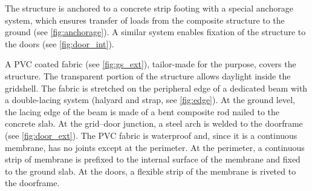 The structure is anchored to a concrete strip footing with a special anchorage system, which ensures transfer of loads from the composite structure to the ground (see \cref{fig:anchorage}). A similar system enables fixation of the structure to the doors (see \cref{fig:door_int}).

A PVC coated fabric (see \cref{fig:gs_ext}), tailor-made for the purpose, covers the structure. The transparent portion of the structure allows daylight inside the gridshell. The fabric is stretched on the peripheral edge of a dedicated beam with a double-lacing system (halyard and strap, see \cref{fig:edge}). At the ground level, the lacing edge of the beam is made of a bent composite rod nailed to the concrete slab. At the grid–door junction, a steel arch is welded to the doorframe (see \cref{fig:door_ext}). The PVC fabric is waterproof and, since it is a continuous membrane, has no joints except at the perimeter. At the perimeter, a continuous strip of membrane is prefixed to the internal surface of the membrane and fixed to the ground slab. At the doors, a flexible strip of the membrane is riveted to the doorframe.

